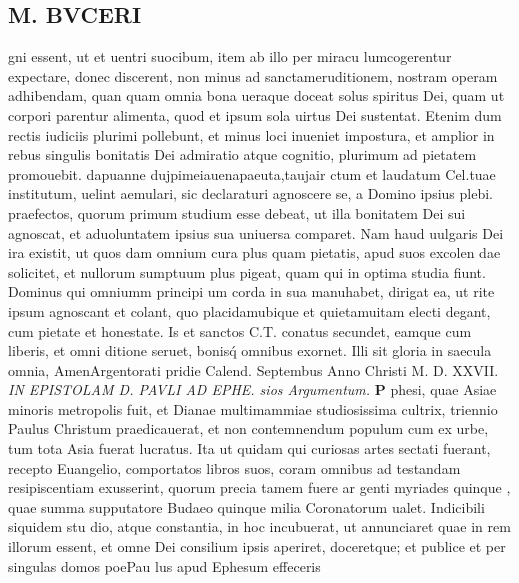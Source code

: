 \documentclass{article}
\begin{document}
\begin{pages}
\section*{M. BVCERI }\pstart gni essent, ut et uentri suocibum, item ab illo per miracu lumcogerentur expectare, donec discerent, non minus ad sanctameruditionem, nostram operam adhibendam, quan quam omnia bona ueraque doceat solus spiritus Dei, quam ut corpori parentur alimenta, quod et ipsum sola uirtus Dei sustentat. Etenim dum rectis iudiciis plurimi pollebunt, et minus loci inueniet impostura, et amplior in rebus singulis bonitatis Dei admiratio atque cognitio, plurimum ad pietatem promouebit.  \pend\pstart dapuanne dujpimeiauenapaeuta,taujair ctum et laudatum Cel.tuae institutum, uelint aemulari, sic declaraturi agnoscere se, a Domino ipsius plebi. praefectos, quorum primum studium esse debeat, ut illa bonitatem Dei sui agnoscat, et aduoluntatem ipsius sua uniuersa comparet. Nam haud uulgaris Dei ira existit, ut quos dam omnium cura plus quam pietatis, apud suos excolen dae solicitet, et nullorum sumptuum plus pigeat, quam qui in optima studia fiunt. Dominus qui omniumm principi um corda in sua manuhabet, dirigat ea, ut rite ipsum agnoscant et colant, quo placidamubique et quietamuitam electi degant, cum pietate et honestate. Is et sanctos C.T. conatus secundet, eamque cum liberis, et omni ditione seruet, bonisq́ omnibus exornet.  Illi sit gloria in saecula omnia, AmenArgentorati pridie Calend. Septembus  Anno Christi M. D. XXVII.  \pend
\textit{IN EPISTOLAM D. PAVLI AD EPHE.  sios Argumentum.  }
\textbf{P }\pstart phesi, quae Asiae minoris metropolis fuit, et Dianae multimammiae studiosissima cultrix, triennio Paulus Christum praedicauerat, et non contemnendum populum cum ex urbe, tum tota Asia fuerat lucratus. Ita ut quidam qui curiosas artes sectati fuerant, recepto Euangelio, comportatos libros suos, coram omnibus ad testandam resipiscentiam exusserint, quorum precia tamem fuere ar genti myriades quinque , quae summa supputatore Budaeo quinque milia Coronatorum ualet.  Indicibili siquidem stu dio, atque constantia, in hoc incubuerat, ut annunciaret quae in rem illorum essent, et omne Dei consilium ipsis aperiret, doceretque; et publice et per singulas domos poe\pendQuae Pau lus apud Ephesum effeceris 

\end{pages}
\end{document}
